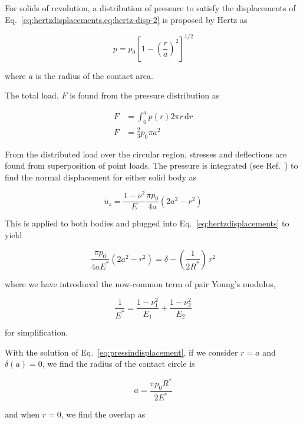 For solids of revolution, a distribution of pressure to satisfy the displacements of Eq.~\ref{eq:hertzdisplacements,eq:hertz-disp-2} is proposed by Hertz as

\begin{equation}
	p = p_0 \left[1-\left(\frac{r}{a}\right)^2\right]^{1/2}
\end{equation}

where $a$ is the radius of the contact area.

The total load, $F$ is found from the pressure distribution as

\begin{align}\label{eq:hertzforcewithpressure}
	F &= \int_0^a \! p(r) 2\pi r\, \mathrm{d}r\\
	F & = \frac{2}{3} p_0 \pi a^2
\end{align}

From the distributed load over the circular region, stresses and deflections are found from superposition of point loads. The pressure is integrated (see Ref.~\cite{Johnson1985}) to find the normal displacement for either solid body as

\begin{equation}
	\bar{u}_z = \frac{1-\nu^2}{E}\frac{\pi p_0}{4a}\left(2a^2 - r^2\right)
\end{equation}

This is applied to both bodies and plugged into Eq.~\ref{eq:hertzdisplacements} to yield

\begin{equation}\label{eq:pressindisplacement}
	\frac{\pi p_0}{4aE^*}\left(2a^2 - r^2\right) = \delta - \left(\frac{1}{2R^*}\right)\, r^2
\end{equation}

where we have introduced the now-common term of pair Young's modulus,

\begin{equation}
	\frac{1}{E^*} = \frac{1-\nu_1^2}{E_1} + \frac{1-\nu_2^2}{E_2}
\end{equation}

for simplification.

With the solution of Eq.~\ref{eq:pressindisplacement}, if we consider $r = a$ and $\delta(a) = 0$, we find the radius of the contact circle is

\begin{equation}
	a = \frac{\pi p_0 R^*}{2E^*}
\end{equation}

and when $r= 0$, we find the overlap as

